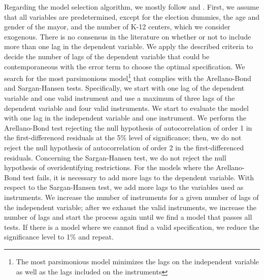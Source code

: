 
Regarding the model selection algorithm, we mostly follow \textcite{kripfganz2019} and \textcite{kiviet2020}. First, we assume that all variables are predetermined, except for the election dummies, the age and gender of the mayor, and the number of K-12 centers, which we consider exogenous. There is no consensus in the literature on whether or not to include more than one lag in the dependent variable. We apply the described criteria to decide the number of lags of the dependent variable that could be contemporaneous with the error term to choose the optimal specification. We search for the most parsimonious model\footnote{The most parsimonious model minimizes the lags on the independent variable as well as the lags included on the instruments} that complies with the Arellano-Bond and Sargan-Hansen tests. Specifically, we start with one lag of the dependent variable and one valid instrument and use a maximum of three lags of the dependent variable and four valid instruments. We start to evaluate the model with one lag in the independent variable and one instrument. We perform the Arellano-Bond test rejecting the null hypothesis of autocorrelation of order 1 in the first-differenced residuals at the 5\% level of significance; then, we do not reject the null hypothesis of autocorrelation of order 2 in the first-differenced residuals. Concerning the Sargan-Hansen test, we do not reject the null hypothesis of overidentifying restrictions. For the models where the Arellano-Bond test fails, it is necessary to add more lags to the dependent variable. With respect to the Sargan-Hansen test, we add more lags to the variables used as instruments. We increase the number of instruments for a given number of lags of the independent variable; after we exhaust the valid instruments, we increase the number of lags and start the process again until we find a model that passes all tests. If there is a model where we cannot find a valid specification, we reduce the significance level to 1\% and repeat. 